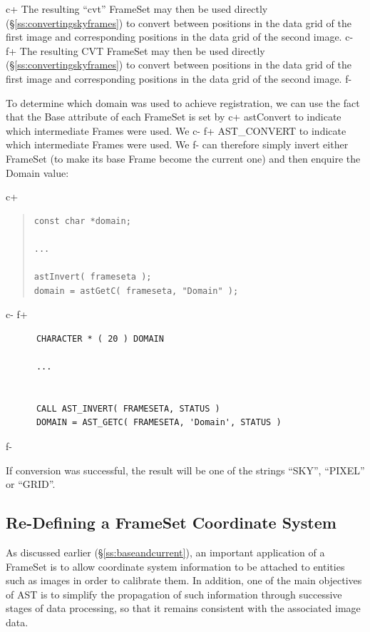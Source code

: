 \documentclass[twoside,11pt]{article}
\newcommand{\secref}[1]{\S\ref{#1}}
\newcommand{\secref}[1]{\ref{#1}}
\begin{document}
c+
The resulting ``cvt'' FrameSet may then be used directly
(\secref{ss:convertingskyframes}) to convert between positions in the
data grid of the first image and corresponding positions in the data
grid of the second image.
c-
f+
The resulting CVT FrameSet may then be used directly
(\secref{ss:convertingskyframes}) to convert between positions in the
data grid of the first image and corresponding positions in the data
grid of the second image.
f-

To determine which domain was used to achieve registration,
we can use the fact that the Base attribute of each FrameSet is set by
c+
astConvert to indicate which intermediate Frames were used. We
c-
f+
AST\_CONVERT to indicate which intermediate Frames were used. We
f-
can therefore simply invert either FrameSet (to make its base Frame
become the current one) and then enquire the Domain value:

c+
\begin{quote}
\small
\begin{verbatim}
const char *domain;

...

astInvert( frameseta );
domain = astGetC( frameseta, "Domain" );
\end{verbatim}
\normalsize
\end{quote}
c-
f+
\small
\begin{verbatim}
      CHARACTER * ( 20 ) DOMAIN

      ...


      CALL AST_INVERT( FRAMESETA, STATUS )
      DOMAIN = AST_GETC( FRAMESETA, 'Domain', STATUS )
\end{verbatim}
\normalsize
f-

If conversion was successful, the result will be one of the strings
``SKY'', ``PIXEL'' or ``GRID''.

\subsection{\label{ss:remapframe}Re-Defining a FrameSet Coordinate System}

As discussed earlier (\secref{ss:baseandcurrent}), an important
application of a FrameSet is to allow coordinate system information to
be attached to entities such as images in order to calibrate them. In
addition, one of the main objectives of AST is to simplify the
propagation of such information through successive stages of data
processing, so that it remains consistent with the associated image
data.
\end{document}
